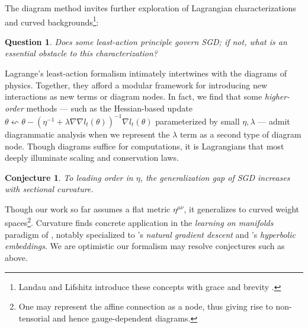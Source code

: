 \documentclass{article}
\newtheorem{quest}{Question}
\newtheorem{conj}{Conjecture}
\begin{document}

    The diagram method invites further exploration of Lagrangian
    characterizations and curved backgrounds\footnote{
        Landau and Lifshitz introduce these concepts with grace and brevity
        .
    }:
    \begin{quest}
        Does some least-action principle govern SGD; if not,
        what is an essential obstacle to this characterization?
    \end{quest}
        Lagrange's least-action formalism intimately intertwines with the
        diagrams of physics.  Together, they afford a modular framework for
        introducing new interactions as new terms or diagram nodes.  In fact,
        we find that some \emph{higher-order} methods --- such as the
        Hessian-based update
        $
            \theta \leftsquigarrow
            \theta -
            (\eta^{-1} + \lambda \nabla \nabla l_t(\theta))^{-1}
            \nabla l_t(\theta)
        $
        parameterized by small $\eta, \lambda$ --- admit diagrammatic analysis
        when we represent the $\lambda$ term as a second type of
        diagram node.  Though diagrams suffice for computations, it is
        Lagrangians that most deeply illuminate scaling and conservation laws.
    \begin{conj}
        To leading order in $\eta$, the generalization gap of SGD  
        increases with sectional curvature.
    \end{conj}
        Though our work so far assumes a flat metric $\eta^{\mu\nu}$, it 
        generalizes to curved weight spaces\footnote{
            One may represent the affine connection as a node, thus giving
            rise to non-tensorial and hence gauge-dependent diagrams.
        }.
        Curvature finds concrete application in the \emph{learning on
        manifolds} paradigm of \citet{bo13}, notably specialized to
        \citet{am98}'s \emph{natural gradient descent} and \citet{ni17}'s
        \emph{hyperbolic embeddings}.  We are optimistic our formalism may
        resolve conjectures such as above.

\end{document}
